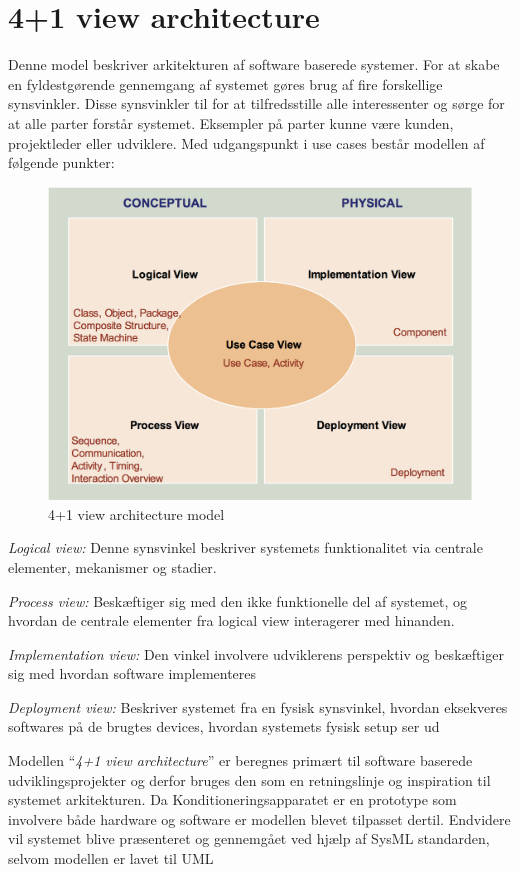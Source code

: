 \section{4+1 view architecture}
Denne model beskriver arkitekturen af software baserede systemer. For at skabe en fyldestgørende gennemgang af systemet gøres brug af fire forskellige synsvinkler. Disse synsvinkler til for at tilfredsstille alle interessenter og sørge for at alle parter forstår systemet. Eksempler på parter kunne være kunden, projektleder eller udviklere. Med udgangspunkt i use cases består modellen af følgende punkter: 

\begin{figure}[H]
	\includegraphics[width=\textwidth]{filer/4plus1model.png}
	\caption{4+1 view architecture model}
\end{figure}

\textit{Logical view:} Denne synsvinkel beskriver systemets funktionalitet via centrale elementer, mekanismer og stadier.

\textit{Process view:} Beskæftiger sig med den ikke funktionelle del af systemet, og hvordan de centrale elementer fra logical view interagerer med hinanden.

\textit{Implementation view:} Den vinkel involvere udviklerens perspektiv og beskæftiger sig med hvordan software implementeres

\textit{Deployment view:} Beskriver systemet fra en fysisk synsvinkel, hvordan eksekveres softwares på de brugtes devices, hvordan systemets fysisk setup ser ud 

Modellen “\textit{4+1 view architecture}” er beregnes primært til software baserede udviklingsprojekter og derfor bruges den som en retningslinje og inspiration til systemet arkitekturen. Da Konditioneringsapparatet er en prototype som involvere både hardware og software er modellen blevet tilpasset dertil. Endvidere vil systemet blive præsenteret og gennemgået ved hjælp af SysML standarden, selvom modellen er lavet til UML

